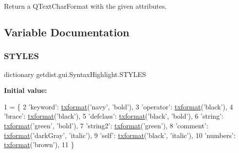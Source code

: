 \begin{DoxyVerb}Return a QTextCharFormat with the given attributes.
\end{DoxyVerb}
 

\subsection{Variable Documentation}
\mbox{\label{namespacegetdist_1_1gui_1_1SyntaxHighlight_a57ea3dde90816b4dfb1f960228f131b8}} 
\subsubsection{\texorpdfstring{S\+T\+Y\+L\+ES}{STYLES}}
{\footnotesize\ttfamily dictionary getdist.\+gui.\+Syntax\+Highlight.\+S\+T\+Y\+L\+ES}

{\bfseries Initial value\+:}
\begin{DoxyCode}
1 =  \{
2     \textcolor{stringliteral}{'keyword'}: \mbox{\hyperlink{namespacegetdist_1_1gui_1_1SyntaxHighlight_ab6a70a500e0d1fb3fa52b25fb15b3dae}{txformat}}(\textcolor{stringliteral}{'navy'}, \textcolor{stringliteral}{'bold'}),
3     \textcolor{stringliteral}{'operator'}: \mbox{\hyperlink{namespacegetdist_1_1gui_1_1SyntaxHighlight_ab6a70a500e0d1fb3fa52b25fb15b3dae}{txformat}}(\textcolor{stringliteral}{'black'}),
4     \textcolor{stringliteral}{'brace'}: \mbox{\hyperlink{namespacegetdist_1_1gui_1_1SyntaxHighlight_ab6a70a500e0d1fb3fa52b25fb15b3dae}{txformat}}(\textcolor{stringliteral}{'black'}),
5     \textcolor{stringliteral}{'defclass'}: \mbox{\hyperlink{namespacegetdist_1_1gui_1_1SyntaxHighlight_ab6a70a500e0d1fb3fa52b25fb15b3dae}{txformat}}(\textcolor{stringliteral}{'black'}, \textcolor{stringliteral}{'bold'}),
6     \textcolor{stringliteral}{'string'}: \mbox{\hyperlink{namespacegetdist_1_1gui_1_1SyntaxHighlight_ab6a70a500e0d1fb3fa52b25fb15b3dae}{txformat}}(\textcolor{stringliteral}{'green'}, \textcolor{stringliteral}{'bold'}),
7     \textcolor{stringliteral}{'string2'}: \mbox{\hyperlink{namespacegetdist_1_1gui_1_1SyntaxHighlight_ab6a70a500e0d1fb3fa52b25fb15b3dae}{txformat}}(\textcolor{stringliteral}{'green'}),
8     \textcolor{stringliteral}{'comment'}: \mbox{\hyperlink{namespacegetdist_1_1gui_1_1SyntaxHighlight_ab6a70a500e0d1fb3fa52b25fb15b3dae}{txformat}}(\textcolor{stringliteral}{'darkGray'}, \textcolor{stringliteral}{'italic'}),
9     \textcolor{stringliteral}{'self'}: \mbox{\hyperlink{namespacegetdist_1_1gui_1_1SyntaxHighlight_ab6a70a500e0d1fb3fa52b25fb15b3dae}{txformat}}(\textcolor{stringliteral}{'black'}, \textcolor{stringliteral}{'italic'}),
10     \textcolor{stringliteral}{'numbers'}: \mbox{\hyperlink{namespacegetdist_1_1gui_1_1SyntaxHighlight_ab6a70a500e0d1fb3fa52b25fb15b3dae}{txformat}}(\textcolor{stringliteral}{'brown'}),
11 \}
\end{DoxyCode}
